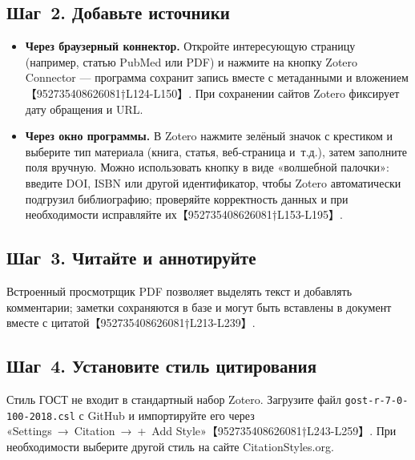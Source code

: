 \documentclass[
  russian,
  letterpaper,
]{book}
\providecommand{\tightlist}{%
  \setlength{\itemsep}{0pt}\setlength{\parskip}{0pt}}
\begin{document}
\subsection{Шаг~2. Добавьте
источники}\label{ux448ux430ux433-2.-ux434ux43eux431ux430ux432ux44cux442ux435-ux438ux441ux442ux43eux447ux43dux438ux43aux438}

\begin{itemize}
\tightlist
\item
  \textbf{Через браузерный коннектор.} Откройте интересующую страницу
  (например, статью PubMed или PDF) и нажмите на кнопку Zotero Connector
  --- программа сохранит запись вместе с метаданными и
  вложением【952735408626081†L124-L150】. При сохранении сайтов Zotero
  фиксирует дату обращения и URL.
\item
  \textbf{Через окно программы.} В Zotero нажмите зелёный значок с
  крестиком и выберите тип материала (книга, статья, веб‑страница
  и~т.д.), затем заполните поля вручную. Можно использовать кнопку в
  виде «волшебной палочки»: введите DOI, ISBN или другой идентификатор,
  чтобы Zotero автоматически подгрузил библиографию; проверяйте
  корректность данных и при необходимости исправляйте
  их【952735408626081†L153-L195】.
\end{itemize}

\subsection{Шаг~3. Читайте и
аннотируйте}\label{ux448ux430ux433-3.-ux447ux438ux442ux430ux439ux442ux435-ux438-ux430ux43dux43dux43eux442ux438ux440ux443ux439ux442ux435}

Встроенный просмотрщик PDF позволяет выделять текст и добавлять
комментарии; заметки сохраняются в базе и могут быть вставлены в
документ вместе с цитатой【952735408626081†L213-L239】.

\subsection{Шаг~4. Установите стиль
цитирования}\label{ux448ux430ux433-4.-ux443ux441ux442ux430ux43dux43eux432ux438ux442ux435-ux441ux442ux438ux43bux44c-ux446ux438ux442ux438ux440ux43eux432ux430ux43dux438ux44f}

Стиль ГОСТ не входит в стандартный набор Zotero. Загрузите файл
\texttt{gost-r-7-0-100-2018.csl} с GitHub и импортируйте его через
«Settings~→~Citation~→~+~Add Style»【952735408626081†L243-L259】. При
необходимости выберите другой стиль на сайте CitationStyles.org.
\end{document}
